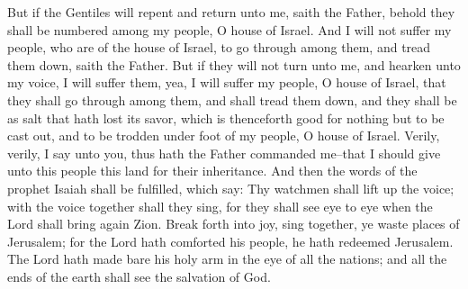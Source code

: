 But if the Gentiles will repent and return unto me, saith the Father, behold they shall be numbered among my people, O house of Israel.
\bverse \iffalse And I will not suffer my people, who are of the house of Israel, to go through among them, and tread them down, saith the Father. \fi
And I will not suffer my people, who are of the house of Israel, to go through among them, and tread them down, saith the Father.
\bverse \iffalse But if they will not turn unto me, and hearken unto my voice, I will suffer them, yea, I will suffer my people, O house of Israel, that they shall go through among them, and shall tread them down, and they shall be as salt that hath lost its savor, which is thenceforth good for nothing but to be cast out, and to be trodden under foot of my people, O house of Israel. \fi
But if they will not turn unto me, and hearken unto my voice, I will suffer them, yea, I will suffer my people, O house of Israel, that they shall go through among them, and shall tread them down, and they shall be as salt that hath lost its savor, which is thenceforth good for nothing but to be cast out, and to be trodden under foot of my people, O house of Israel.
\bverse \iffalse Verily, verily, I say unto you, thus hath the Father commanded me--that I should give unto this people this land for their inheritance. \fi
Verily, verily, I say unto you, thus hath the Father commanded me--that I should give unto this people this land for their inheritance.
\bverse \iffalse And then the words of the prophet Isaiah shall be fulfilled, which say: \fi
And then the words of the prophet Isaiah shall be fulfilled, which say:
\bverse \iffalse Thy watchmen shall lift up the voice; with the voice together shall they sing, for they shall see eye to eye when the Lord shall bring again Zion. \fi
Thy watchmen shall lift up the voice; with the voice together shall they sing, for they shall see eye to eye when the Lord shall bring again Zion.
\bverse \iffalse Break forth into joy, sing together, ye waste places of Jerusalem; for the Lord hath comforted his people, he hath redeemed Jerusalem. \fi
Break forth into joy, sing together, ye waste places of Jerusalem; for the Lord hath comforted his people, he hath redeemed Jerusalem.
\bverse \iffalse The Lord hath made bare his holy arm in the eye of all the nations; and all the ends of the earth shall see the salvation of God. \fi
The Lord hath made bare his holy arm in the eye of all the nations; and all the ends of the earth shall see the salvation of God.
